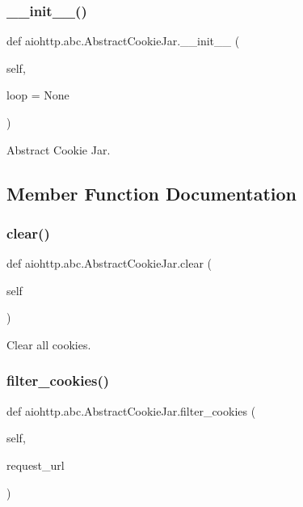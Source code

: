 \subsubsection{\texorpdfstring{\+\_\+\+\_\+init\+\_\+\+\_\+()}{\_\_init\_\_()}}
{\footnotesize\ttfamily def aiohttp.\+abc.\+Abstract\+Cookie\+Jar.\+\_\+\+\_\+init\+\_\+\+\_\+ (\begin{DoxyParamCaption}\item[{}]{self,  }\item[{}]{loop = {\ttfamily None} }\end{DoxyParamCaption})}

\begin{DoxyVerb}Abstract Cookie Jar.\end{DoxyVerb}
 

\subsection{Member Function Documentation}
\mbox{\label{classaiohttp_1_1abc_1_1_abstract_cookie_jar_a37eabb01e12bee6de52511f1112a883e}} 
\subsubsection{\texorpdfstring{clear()}{clear()}}
{\footnotesize\ttfamily def aiohttp.\+abc.\+Abstract\+Cookie\+Jar.\+clear (\begin{DoxyParamCaption}\item[{}]{self }\end{DoxyParamCaption})}

\begin{DoxyVerb}Clear all cookies.\end{DoxyVerb}
 \mbox{\label{classaiohttp_1_1abc_1_1_abstract_cookie_jar_a70ff587a4f911792e5ffa6e147f544b2}} 
\subsubsection{\texorpdfstring{filter\+\_\+cookies()}{filter\_cookies()}}
{\footnotesize\ttfamily def aiohttp.\+abc.\+Abstract\+Cookie\+Jar.\+filter\+\_\+cookies (\begin{DoxyParamCaption}\item[{}]{self,  }\item[{}]{request\+\_\+url }\end{DoxyParamCaption})}

